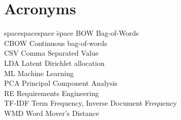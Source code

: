\section*{Acronyms}

\begin{tabbing}
spacespacespace \= space \kill
BOW \> Bag-of-Words\\
CBOW \> Continuous bag-of-words \\
CSV \> Comma Separated Value \\
LDA	\>	Latent Dirichlet allocation \\
ML \> Machine Learning\\
PCA \> Principal Component Analysis\\
RE	\>	Requirements Engineering \\
TF-IDF \> Term Frequency, Inverse Document Frequency \\
WMD \> Word Mover's Distance\\
\end{tabbing}